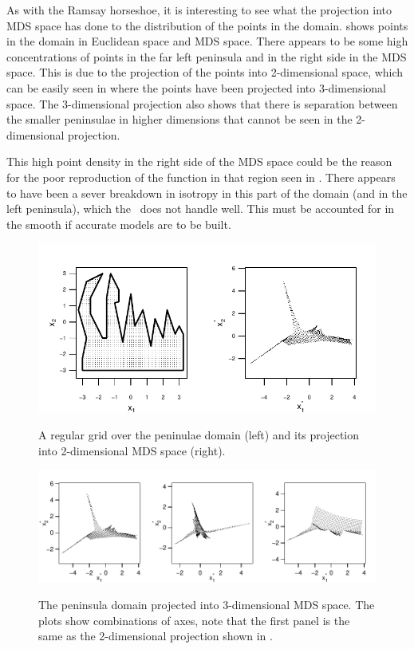 As with the Ramsay horseshoe, it is interesting to see what the projection into MDS space has done to the distribution of the points in the domain.  shows points in the domain in Euclidean space and MDS space. There appears to be some high concentrations of points in the far left peninsula and in the right side in the MDS space. This is due to the projection of the points into 2-dimensional space, which can be easily seen in  where the points have been projected into 3-dimensional space. The 3-dimensional projection also shows that there is separation between the smaller peninsulae in higher dimensions that cannot be seen in the 2-dimensional projection.

This high point density in the right side of the MDS space could be the reason for the poor reproduction of the function in that region seen in . There appears to have been a sever breakdown in isotropy in this part of the domain (and in the left peninsula), which the \tprs\ does not handle well. This must be accounted for in the smooth if accurate models are to be built.

\begin{figure}
\centering
\includegraphics[width=6in]{mds/figs/wt2-2d-proj.pdf} \\
\caption{A regular grid over the peninulae domain (left) and its projection into 2-dimensional MDS space (right).}
\label{wt2-2d-proj}
\end{figure}

\begin{figure}
\includegraphics[width=9in]{mds/figs/wt2-3d-proj.pdf} \\
\caption{The peninsula domain projected into 3-dimensional MDS space. The plots show combinations of axes, note that the first panel is the same as the 2-dimensional projection shown in .}
\label{wt2-3d-proj}
\end{figure}

